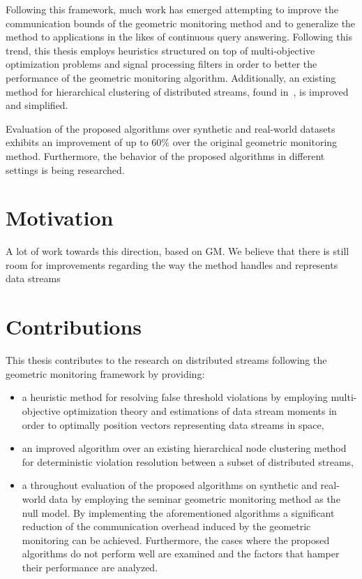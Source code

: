 Following this framework, much work has emerged attempting to improve the communication bounds of the geometric monitoring method and to generalize the method to applications in the likes of continuous query answering. Following this trend, this thesis employs heuristics structured on top of multi-objective optimization problems and signal processing filters in order to better the performance of the geometric monitoring algorithm. Additionally, an existing method for hierarchical clustering of distributed streams, found in~\cite{Sharfman2012ShapeSensGM}, is improved and simplified.

Evaluation of the proposed algorithms over synthetic and real-world datasets exhibits an improvement of up to 60\% over the original geometric monitoring method. Furthermore, the behavior of the proposed algorithms in different settings is being researched.


\section{Motivation} \label{sec:intro-motivation}




A lot of work towards this direction, based on GM.
We believe that there is still room for improvements regarding the way the method handles and represents data streams

\section{Contributions} \label{sec:intro-contr}

This thesis contributes to the research on distributed streams following the geometric monitoring framework by providing:
\begin{itemize}
\item a heuristic method for resolving false threshold violations by employing multi-objective optimization theory and estimations of data stream moments in order to optimally position vectors representing data streams in space,
\item an improved algorithm over an existing hierarchical node clustering method for deterministic violation resolution between a subset of distributed streams,
\item a throughout evaluation of the proposed algorithms on synthetic and real-world data by employing the seminar geometric monitoring method as the null model. By implementing the aforementioned algorithms a significant reduction of the communication overhead induced by the geometric monitoring can be achieved. Furthermore, the cases where the proposed algorithms do not perform well are examined and the factors that hamper their performance are analyzed.
\end{itemize}

